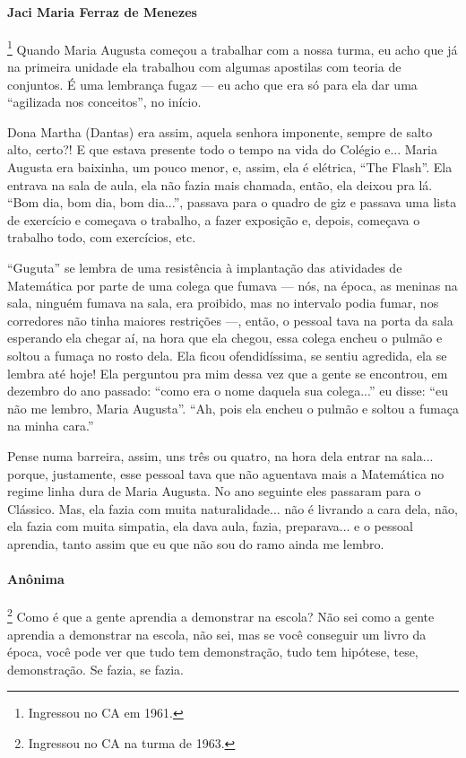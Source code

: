 \documentclass{hipatia}
\begin{document}
\paragraph{Jaci Maria Ferraz de Menezes}\footnote{Ingressou no CA em 1961.}
Quando Maria Augusta começou a trabalhar com a nossa turma, eu acho que
já na primeira unidade ela trabalhou com algumas apostilas com teoria de
conjuntos. É uma lembrança fugaz --- eu acho que era só para ela dar uma
``agilizada nos conceitos'', no início.

Dona Martha (Dantas) era assim, aquela senhora imponente, sempre de
salto alto, certo?! E que estava presente todo o tempo na vida do
Colégio e... Maria Augusta era baixinha, um pouco menor, e, assim, ela é
elétrica, ``The Flash''. Ela entrava na sala de aula, ela não fazia mais
chamada, então, ela deixou pra lá. ``Bom dia, bom dia, bom dia...'',
passava para o quadro de giz e passava uma lista de exercício e começava
o trabalho, a fazer exposição e, depois, começava o trabalho todo, com
exercícios, etc.

``Guguta'' se lembra de uma resistência à implantação das atividades de
Matemática por parte de uma colega que fumava --- nós, na época, as
meninas na sala, ninguém fumava na sala, era proibido, mas no intervalo
podia fumar, nos corredores não tinha maiores restrições ---, então, o
pessoal tava na porta da sala esperando ela chegar aí, na hora que ela
chegou, essa colega encheu o pulmão e soltou a fumaça no rosto dela. Ela
ficou ofendidíssima, se sentiu agredida, ela se lembra até hoje! Ela
perguntou pra mim dessa vez que a gente se encontrou, em dezembro do ano
passado: ``como era o nome daquela sua colega...'' eu disse: ``eu não me
lembro, Maria Augusta''. ``Ah, pois ela encheu o pulmão e soltou a
fumaça na minha cara.''

Pense numa barreira, assim, uns três ou quatro, na hora dela entrar na
sala... porque, justamente, esse pessoal tava que não aguentava mais a
Matemática no regime linha dura de Maria Augusta. No ano seguinte eles
passaram para o Clássico. Mas, ela fazia com muita naturalidade... não é
livrando a cara dela, não, ela fazia com muita simpatia, ela dava aula,
fazia, preparava... e o pessoal aprendia, tanto assim que eu que não sou
do ramo ainda me lembro.

\paragraph{Anônima}\footnote{Ingressou no CA na turma de 1963.}
Como é que a gente aprendia a demonstrar na escola? Não sei como a gente
aprendia a demonstrar na escola, não sei, mas se você conseguir um livro
da época, você pode ver que tudo tem demonstração, tudo tem hipótese,
tese, demonstração. Se fazia, se fazia.
\end{document}

